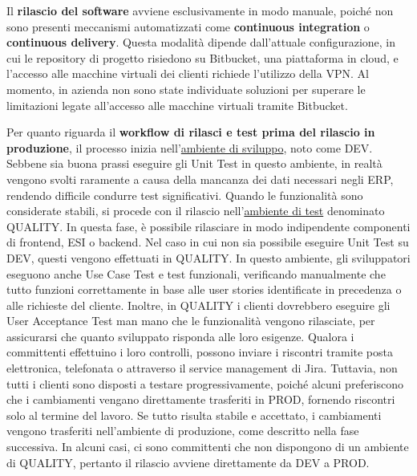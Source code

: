         Il \textbf{rilascio del software} avviene esclusivamente in modo manuale, poiché non sono presenti meccanismi automatizzati come \textbf{continuous integration}
        o \textbf{continuous delivery}. Questa modalità dipende dall'attuale configurazione, in cui le repository di progetto risiedono su Bitbucket, una piattaforma
        in cloud, e l’accesso alle macchine virtuali dei clienti richiede l’utilizzo della VPN. Al momento, in azienda non sono state individuate soluzioni per superare le limitazioni
        legate all'accesso alle macchine virtuali tramite Bitbucket.

        Per quanto riguarda il \textbf{workflow di rilasci e test prima del rilascio in produzione}, il processo inizia nell'\underline{ambiente di sviluppo}, noto come DEV.
        Sebbene sia buona prassi eseguire gli Unit Test in questo ambiente, in realtà vengono svolti raramente a causa della mancanza dei dati necessari negli \ac{ERP},
        rendendo difficile condurre test significativi. Quando le funzionalità sono considerate stabili, si procede con il rilascio nell'\underline{ambiente di test} denominato
        QUALITY. In questa fase, è possibile rilasciare in modo indipendente componenti di frontend, \ac{ESI} o backend. Nel caso in cui non sia possibile eseguire Unit
        Test su DEV, questi vengono effettuati in QUALITY. In questo ambiente, gli sviluppatori eseguono anche Use Case
        Test e test funzionali, verificando manualmente che tutto funzioni correttamente in base alle user stories identificate in precedenza o alle richieste del cliente.
        Inoltre, in QUALITY i clienti dovrebbero eseguire gli User Acceptance Test man mano che le funzionalità vengono rilasciate, per assicurarsi che quanto sviluppato
        risponda alle loro esigenze. Qualora i committenti effettuino i loro controlli, possono inviare i riscontri tramite posta elettronica, telefonata o attraverso il service
        management di Jira. Tuttavia, non tutti i clienti sono disposti a testare progressivamente, poiché alcuni preferiscono che i cambiamenti vengano direttamente
        trasferiti in PROD, fornendo riscontri solo al termine del lavoro. Se tutto risulta stabile e accettato, i cambiamenti vengono trasferiti nell'ambiente di produzione,
        come descritto nella fase successiva. In alcuni casi, ci sono
        committenti che non dispongono di un ambiente di QUALITY, pertanto il rilascio avviene direttamente da DEV a PROD.

